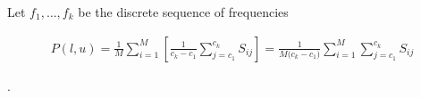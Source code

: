 \documentclass[a4paper, 12pt]{article}
\begin{document}
Let $f_1, \ldots, f_k$ be the discrete sequence of frequencies
    
\begin{align*}
P(l, u) = \frac{1}{M} \sum_{i=1}^{M}\left[\frac{1}{c_k - c_1}\sum_{j=c_1}^{c_k} S_{ij}\right] = \frac{1}{M\big(c_k - c_1\big)}\sum_{i=1}^{M}\sum_{j=c_1}^{c_k} S_{ij}
\end{align*}

.
\end{document}
